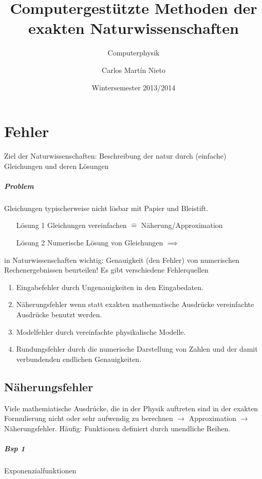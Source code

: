 \documentclass[a4paper,ngerman]{scrbook}
\title{Computergestützte Methoden der exakten Naturwissenschaften }
\subtitle{Computerphysik}
\date{Wintersemester 2013/2014}
\author{Carlos Martín Nieto}
\begin{document}
\maketitle
\chapter{Fehler}

Ziel der Naturwissenschaften: Beschreibung der natur durch (einfache) Gleichungen und deren Lösungen

\paragraph{Problem}

Gleichungen typischerweise nicht lösbar mit Papier und Bleistift.
\begin{itemize}
\item[Lösung 1] Gleichungen vereinfachen $\hat{=}$ Näherung/Approximation
\item[Lösung 2] Numerische Lösung von Gleichungen $\implies$ 
\end{itemize}

in Naturwissenschaften wichtig: Genauigkeit (den Fehler) von numerischen Rechenergebnissen beurteilen! Es gibt verschiedene Fehlerquellen
\begin{enumerate}
\item Eingabefehler durch Ungenauigkeiten in den Eingabedaten.
\item Näherungsfehler wenn statt exakten mathematische Ausdrücke vereinfachte Ausdrücke benutzt werden.
\item Modelfehler durch vereinfachte physikalische Modelle.
\item Rundungsfehler durch die numerische Darstellung von Zahlen und der damit verbundenden endlichen Genauigkeiten.
\end{enumerate}

\section{Näherungsfehler}

Viele mathemiatische Ausdrúcke, die in der Physik auftreten sind in der exakten Formulierung nicht oder sehr aufwendig zu berechnen $\to$ Approximation $\to$ Näherungsfehler. Häufig: Funktionen definiert durch unendliche Reihen.

\paragraph{Bsp 1}
Exponenzialfunktionen
\end{document}
